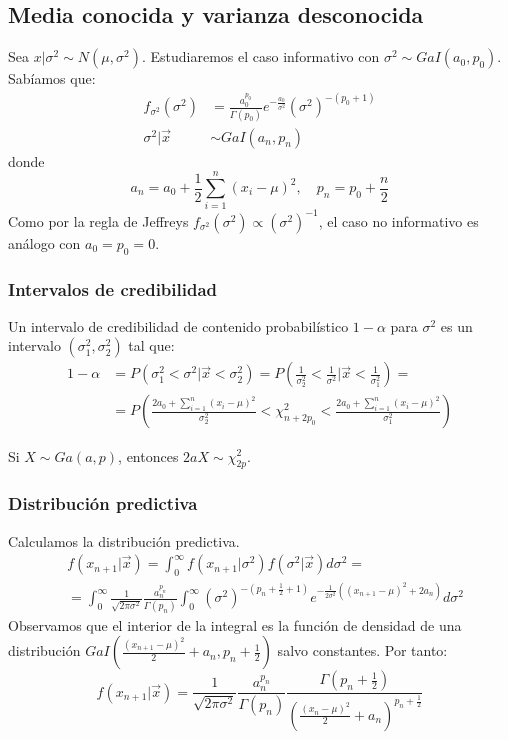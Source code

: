 \subsection*{Media conocida y varianza desconocida}
Sea $x|\sigma^2 \sim N(\mu, \sigma^2)$.
Estudiaremos el caso informativo con $\sigma^2 \sim GaI(a_0, p_0)$.
Sabíamos que:
\begin{align*}
    f_{\sigma^2}(\sigma^2) & = \frac{a_0^{p_0}}{\Gamma(p_0)}e^{-\frac{a_0}{\sigma^2}}(\sigma^2)^{-(p_0+1)} \\
    \sigma^2|\vec{x}       & \sim GaI(a_n, p_n)
\end{align*}
donde
$$a_n = a_0 + \frac{1}{2}\sum_{i=1}^n(x_i-\mu)^2, \quad p_n = p_0 + \frac{n}{2}$$
Como por la regla de Jeffreys $f_{\sigma^2}(\sigma^2) \propto (\sigma^2)^{-1}$, el caso no informativo es análogo con $a_0 = p_0 = 0$.

\subsubsection*{Intervalos de credibilidad}
Un intervalo de credibilidad de contenido probabilístico $1-\alpha$ para $\sigma^2$ es un intervalo $(\sigma^2_1, \sigma^2_2)$ tal que:
\begin{align*}
    1-\alpha & = P(\sigma^2_1 < \sigma^2|\vec{x} < \sigma^2_2) = P(\frac{1}{\sigma^2_2} < \frac{1}{\sigma^2}|\vec{x} < \frac{1}{\sigma^2_1}) =           \\
             & = P\left(\frac{2a_0 + \sum_{i=1}^n (x_i-\mu)^2}{\sigma^2_2} < \chi^2_{n+2p_0} < \frac{2a_0 + \sum_{i=1}^n (x_i-\mu)^2}{\sigma^2_1}\right)
\end{align*}

\begin{note}
    Si $X \sim Ga(a, p)$, entonces $2aX \sim \chi^2_{2p}$.
\end{note}

\subsubsection*{Distribución predictiva}
Calculamos la distribución predictiva.
\begin{align*}
     & f(x_{n+1}|\vec{x}) = \int_0^\infty f(x_{n+1}|\sigma^2)f(\sigma^2|\vec{x})d\sigma^2 =                                                                                                 \\
     & = \int_0^\infty \frac{1}{\sqrt{2\pi\sigma^2}}\frac{a_n^{p_n}}{\Gamma(p_n)} \int_0^\infty (\sigma^2)^{-(p_n+\frac{1}{2}+1)} e^{-\frac{1}{2\sigma^2}((x_{n+1}-\mu)^2 + 2a_n)}d\sigma^2
\end{align*}
Observamos que el interior de la integral es la función de densidad de una distribución $GaI\left(\frac{(x_{n+1}-\mu)^2}{2} + a_n, p_n + \frac{1}{2}\right)$ salvo constantes.
Por tanto:
$$f(x_{n+1}|\vec{x}) = \frac{1}{\sqrt{2\pi\sigma^2}}\frac{a_n^{p_n}}{\Gamma(p_n)} \frac{\Gamma\left(p_n+\frac{1}{2}\right)}{\left(\frac{(x_n-\mu)^2}{2}+a_n\right)^{p_n+\frac{1}{2}}}$$

